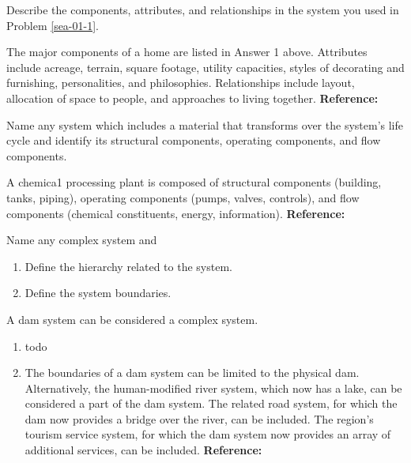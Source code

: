 \begin{exercises}
    \begin{exercise} 
    \label{sea-01-02}
        Describe the components, attributes, and relationships in the system you used in Problem \ref{sea-01-1}.
    \end{exercise}
    \begin{solution}
        The major components of a home are listed in Answer 1 above. Attributes include acreage, terrain, square footage, utility capacities, styles of decorating and furnishing, personalities, and philosophies. Relationships include layout, allocation of space to people, and approaches to living together. \textbf{Reference:}
    \end{solution}
    
    \begin{exercise}
    \label{sea-01-03}
        Name any system which includes a material that transforms over the system's life cycle and identify its structural components, operating components, and flow components.
    \end{exercise}
    \begin{solution}
        A chemica1 processing plant is composed of structural components (building, tanks, piping), operating components (pumps, valves, controls), and flow components (chemical constituents, energy, information). \textbf{Reference:}
    \end{solution}
    
    \begin{exercise} 
    \label{sea-01-04_05}
        Name any complex system and
        \begin{enumerate}[label=\alph*)]
            \item Define the hierarchy related to the system.
            \item Define the system boundaries.
        \end{enumerate}
    \end{exercise}
    \begin{solution}
        A dam system can be considered a complex system.
        \begin{enumerate}[label=\alph*)]
            \item todo
            \item The boundaries of a dam system can be limited to the physical dam. Alternatively, the human-modified river system, which now has a lake, can be considered a part of the dam system. The related road system, for which the dam now provides a bridge over the river, can be included. The region’s tourism service system, for which the dam system now provides an array of additional services, can be included. \textbf{Reference:}
        \end{enumerate}
    \end{solution}
    

\end{exercises}
